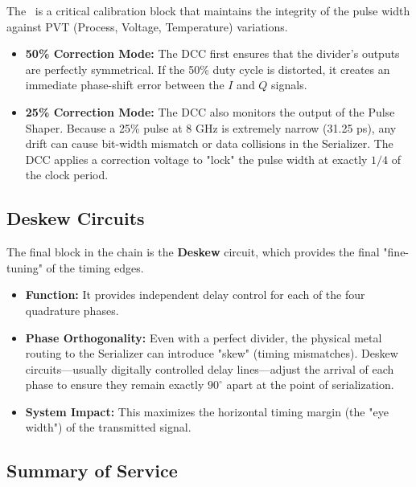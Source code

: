 \documentclass[12pt, a4paper]{report}
\newcommand{\DCC}{\text{DCC}}
\begin{document}
The \DCC\ is a critical calibration block that maintains the integrity of the pulse width against PVT (Process, Voltage, Temperature) variations.

\begin{itemize}
    \item \textbf{50\% Correction Mode:} The DCC first ensures that the divider's outputs are perfectly symmetrical. If the 50\% duty cycle is distorted, it creates an immediate phase-shift error between the \(I\) and \(Q\) signals.
    
    \item \textbf{25\% Correction Mode:} The DCC also monitors the output of the Pulse Shaper. Because a 25\% pulse at 8 GHz is extremely narrow (31.25 ps), any drift can cause bit-width mismatch or data collisions in the Serializer. The DCC applies a correction voltage to "lock" the pulse width at exactly \(1/4\) of the clock period.
\end{itemize}

\subsection{Deskew Circuits}
\label{subsec:deskew-circuits}

The final block in the chain is the \textbf{Deskew} circuit, which provides the final "fine-tuning" of the timing edges.

\begin{itemize}
    \item \textbf{Function:} It provides independent delay control for each of the four quadrature phases.
    
    \item \textbf{Phase Orthogonality:} Even with a perfect divider, the physical metal routing to the Serializer can introduce "skew" (timing mismatches). Deskew circuits—usually digitally controlled delay lines—adjust the arrival of each phase to ensure they remain exactly \(90^\circ\) apart at the point of serialization.
    
    \item \textbf{System Impact:} This maximizes the horizontal timing margin (the "eye width") of the transmitted signal.
\end{itemize}

\subsection{Summary of Service}
\label{subsec:summary-service}
\end{document}

